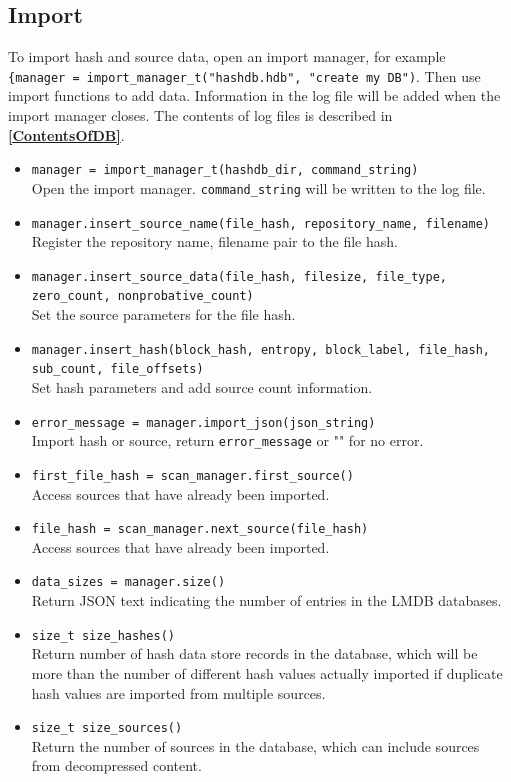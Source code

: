 \documentclass[11pt,fleqn]{article} %
\begin{document}
\subsection{Import}
To import hash and source data, open an import manager, for example\\
\verb+{manager = import_manager_t("hashdb.hdb", "create my DB")+. Then use import functions to add data. Information in the log file will be added when the import manager closes. The contents of log files is described in \textbf{\autoref{ContentsOfDB}}.\\
\begin{itemize}
\item \verb+manager = import_manager_t(hashdb_dir, command_string)+\\
Open the import manager. \verb+command_string+ will be written to the log file.
\item \verb+manager.insert_source_name(file_hash, repository_name, filename)+\\
Register the repository name, filename pair to the file hash.
\item \verb+manager.insert_source_data(file_hash, filesize, file_type,+\\
\verb+zero_count, nonprobative_count)+\\
Set the source parameters for the file hash.
\item \verb+manager.insert_hash(block_hash, entropy, block_label, file_hash,+\\
\verb+sub_count, file_offsets)+\\
Set hash parameters and add source count information.
\item \verb+error_message = manager.import_json(json_string)+\\
Import hash or source, return \verb+error_message+ or "" for no error.
\item \verb+first_file_hash = scan_manager.first_source()+\\
Access sources that have already been imported.
\item \verb+file_hash = scan_manager.next_source(file_hash)+\\
Access sources that have already been imported.
\item \verb+data_sizes = manager.size()+\\
Return JSON text indicating the number of entries in the LMDB databases.
\item \verb+size_t size_hashes()+\\
Return number of hash data store records in the database, which will be more than the number of different hash values actually imported if duplicate hash values are imported from multiple sources.
\item \verb+size_t size_sources()+\\
Return the number of sources in the database, which can include sources from decompressed content.
\end{itemize}
\end{document}
